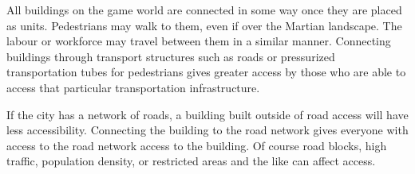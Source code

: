 


%  


All buildings on the game world are connected in some way once they are placed as units. Pedestrians may walk to them, even if over the Martian landscape. The labour or workforce may travel between them in a similar manner. Connecting buildings through transport structures such as roads or pressurized transportation tubes for pedestrians gives greater access by those who are able to access that particular transportation infrastructure. 

If the city has a network of roads, a building built outside of road access will have less accessibility. Connecting the building to the road network gives everyone with access to the road network access to the building. Of course road blocks, high traffic, population density, or restricted areas and the like can affect access.

